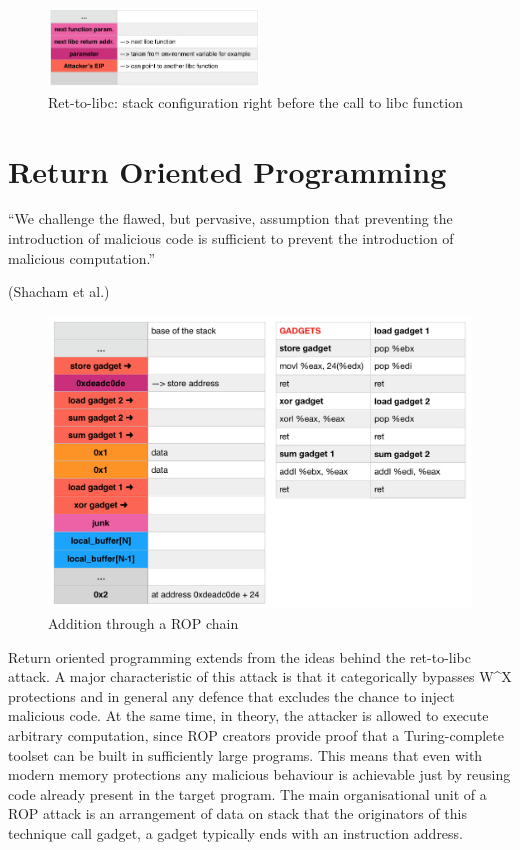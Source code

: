 \documentclass[Lau,binding=0.6cm]{sapthesis}
\begin{document}
\begin{figure}
\centering
\includegraphics[width=0.5\textwidth]{ret-to-libc2}
\caption{Ret-to-libc: stack configuration right before the call to libc function}
\label{fig:largenenough}
\end{figure}

\section{Return Oriented Programming}

\setlength{\epigraphwidth}{1.0\textwidth}
\epigraph{“We challenge the flawed, but pervasive, assumption that preventing the introduction of malicious code is sufficient to prevent the introduction of malicious computation.”}{(Shacham et al.)}

\begin{figure}
\centering
\includegraphics[width=1\textwidth]{ropadd}
\caption{Addition through a ROP chain}
\label{fig:largenenough}
\end{figure}

Return oriented programming extends from the ideas behind the ret-to-libc attack. A major characteristic of this attack is that it categorically bypasses W\textasciicircum X protections and in general any defence that excludes the chance to inject malicious code. At the same time, in theory, the attacker is allowed to execute arbitrary computation, since ROP creators provide proof that a Turing-complete toolset can be built in sufficiently large programs. 
This means that even with modern memory protections any malicious behaviour is achievable just by reusing code already present in the target program.
The main organisational unit of a ROP attack is an arrangement of data on stack that the originators of this technique call gadget, a gadget typically ends with an instruction address.
\end{document}
